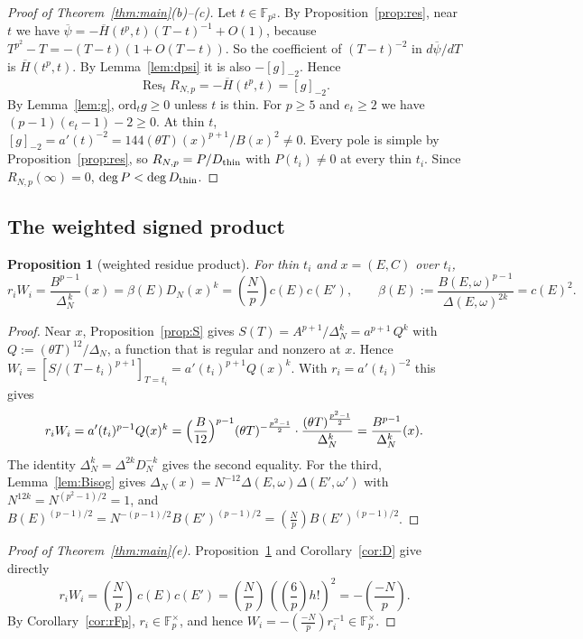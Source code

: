 \documentclass[11pt,a4paper]{article}
\numberwithin{equation}{section}
\newtheorem{proposition}[theorem]{Proposition}
\theoremstyle{definition}
\theoremstyle{remark}
\newcommand{\Fp}{\mathbb F_p}
\newcommand{\Fq}{\mathbb F_{p^2}}
\newcommand{\Res}{\operatorname{Res}}
\newcommand{\Lp}[1]{\left(\frac{#1}{p}\right)}
\begin{document}
\begin{proof}[Proof of Theorem~\ref{thm:main}(b)--(c)]
Let $t\in\Fq$. By Proposition~\ref{prop:res}, near $t$ we have
$\overline\psi=-\overline H(t^p,t)(T-t)^{-1}+O(1)$, because $T^{p^2}-T=-(T-t)(1+O(T-t))$. So the
coefficient of $(T-t)^{-2}$ in $d\overline\psi/dT$ is $\overline H(t^p,t)$. By Lemma~\ref{lem:dpsi}
it is also $-[g]_{-2}$. Hence
\[
\Res_tR_{N,p}=-\overline H(t^p,t)=[g]_{-2}.
\]
By Lemma~\ref{lem:g}, $\mathrm{ord}_tg\ge0$ unless $t$ is thin. For $p\ge5$ and $e_t\ge2$ we have
$(p-1)(e_t-1)-2\ge0$. At thin $t$, $[g]_{-2}=a'(t)^{-2}=144(\theta T)(x)^{p+1}/B(x)^2\ne0$. Every pole is
simple by Proposition~\ref{prop:res}, so $R_{N,p}=P/D_{\rm thin}$ with $P(t_i)\ne0$ at every thin
$t_i$. Since $R_{N,p}(\infty)=0$, $\deg P<\deg D_{\rm thin}$.
\end{proof}

\subsection{The weighted signed product}

\begin{proposition}[weighted residue product]\label{prop:product}
For thin $t_i$ and $x=(E,C)$ over $t_i$,
\[
r_iW_i=\frac{B^{p-1}}{\Delta_N^{\,k}}(x)=\beta(E)D_N(x)^k
=\Lp{N}c(E)c(E'),\qquad \beta(E):=\frac{B(E,\omega)^{p-1}}{\Delta(E,\omega)^{2k}}=c(E)^2.
\]
\end{proposition}
\begin{proof}
Near $x$, Proposition~\ref{prop:S} gives $S(T)=A^{p+1}/\Delta_N^k=a^{p+1}\,Q^{k}$ with
$Q:=(\theta T)^{12}/\Delta_N$, a function that is regular and nonzero at $x$. Hence
$W_i=[S/(T-t_i)^{p+1}]_{T=t_i}=a'(t_i)^{p+1}Q(x)^k$. With $r_i=a'(t_i)^{-2}$ this gives
\[
r_iW_i=a'(t_i)^{p-1}Q(x)^k=\Bigl(\frac{B}{12}\Bigr)^{p-1}(\theta T)^{-\frac{p^2-1}2}\cdot
\frac{(\theta T)^{\frac{p^2-1}{2}}}{\Delta_N^{k}}=\frac{B^{p-1}}{\Delta_N^k}(x).
\]
The identity $\Delta_N^k=\Delta^{2k}D_N^{-k}$ gives the second equality. For the third,
Lemma~\ref{lem:Bisog} gives $\Delta_N(x)=N^{-12}\Delta(E,\omega)\Delta(E',\omega')$ with
$N^{12k}=N^{(p^2-1)/2}=1$, and $B(E)^{(p-1)/2}=N^{-(p-1)/2}B(E')^{(p-1)/2}=\Lp NB(E')^{(p-1)/2}$.
\end{proof}

\begin{proof}[Proof of Theorem~\ref{thm:main}(e)]
Proposition~\ref{prop:product} and Corollary~\ref{cor:D} give directly
\[
r_iW_i=\Lp N\,c(E)c(E')
=\Lp N\,(\Lp6h!)^2=-\Lp{-N}.
\]
By Corollary~\ref{cor:rFp}, $r_i\in\Fp^\times$, and hence
$W_i=-\Lp{-N}r_i^{-1}\in\Fp^\times$.
\end{proof}
\end{document}
